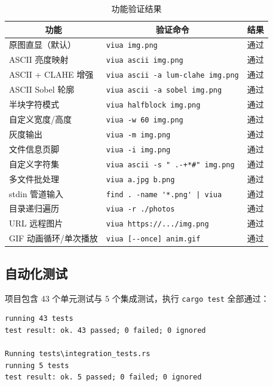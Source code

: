 \documentclass{SYSUReport}
\begin{document}
\begin{table}[!htbp]
    \centering
    \caption{功能验证结果}
    \label{tab:features}
    \begin{tabular}{llc}
        \toprule
        \multicolumn{1}{c}{功能} & \multicolumn{1}{c}{验证命令} & 结果 \\
        \midrule
        原图直显（默认） & \verb|viua img.png| & 通过 \\
        ASCII 亮度映射 & \verb|viua ascii img.png| & 通过 \\
        ASCII + CLAHE 增强 & \verb|viua ascii -a lum-clahe img.png| & 通过 \\
        ASCII Sobel 轮廓 & \verb|viua ascii -a sobel img.png| & 通过 \\
        半块字符模式 & \verb|viua halfblock img.png| & 通过 \\
        自定义宽度/高度 & \verb|viua -w 60 img.png| & 通过 \\
        灰度输出 & \verb|viua -m img.png| & 通过 \\
        文件信息页脚 & \verb|viua -i img.png| & 通过 \\
        自定义字符集 & \verb|viua ascii -s " .-+*#" img.png| & 通过 \\
        多文件批处理 & \verb|viua a.jpg b.png| & 通过 \\
        stdin 管道输入 & \verb+find . -name '*.png' | viua+ & 通过 \\
        目录递归遍历 & \verb|viua -r ./photos| & 通过 \\
        URL 远程图片 & \verb|viua https://.../img.png| & 通过 \\
        GIF 动画循环/单次播放 & \verb|viua [--once] anim.gif| & 通过 \\
        \bottomrule
    \end{tabular}
\end{table}

\subsection{自动化测试}

项目包含 43 个单元测试与 5 个集成测试，执行 \texttt{cargo test} 全部通过：

\begin{verbatim}
running 43 tests
test result: ok. 43 passed; 0 failed; 0 ignored

Running tests\integration_tests.rs
running 5 tests
test result: ok. 5 passed; 0 failed; 0 ignored
\end{verbatim}
\end{document}

